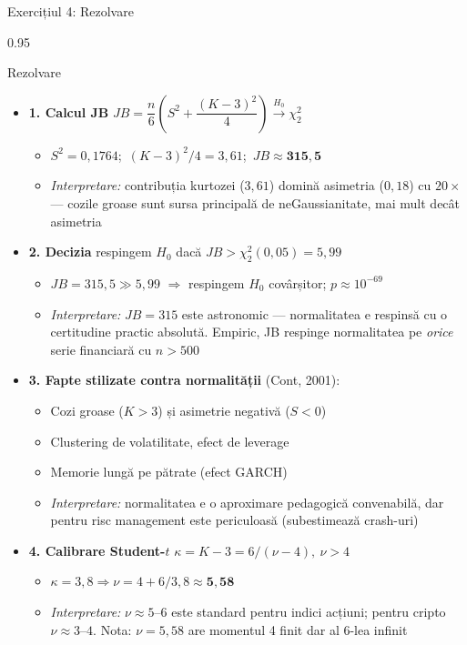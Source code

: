 \documentclass[9pt, aspectratio=169, t]{beamer}
\begin{document}
\begin{frame}[shrink=25]{Exercițiul 4: Rezolvare}
\begin{cminipage}{0.95\textwidth}
\begin{exampleblock}{Rezolvare}
\begin{itemize}\setlength{\itemsep}{0pt}
    \item \textbf{1. Calcul JB} \quad $JB = \dfrac{n}{6}\left(S^2 + \dfrac{(K-3)^2}{4}\right) \xrightarrow{H_0} \chi^2_2$
    \begin{itemize}\setlength{\itemsep}{0pt}
        \item $S^2 = 0{,}1764$;\ $(K-3)^2/4 = 3{,}61$;\ $JB \approx \mathbf{315{,}5}$
        \item \textit{Interpretare:} contribuția kurtozei ($3{,}61$) domină asimetria ($0{,}18$) cu $20\times$ --- cozile groase sunt sursa principală de neGaussianitate, mai mult decât asimetria
    \end{itemize}
    \item \textbf{2. Decizia} \quad respingem $H_0$ dacă $JB > \chi^2_2(0{,}05) = 5{,}99$
    \begin{itemize}\setlength{\itemsep}{0pt}
        \item $JB = 315{,}5 \gg 5{,}99$ $\Rightarrow$ respingem $H_0$ covârșitor; $p \approx 10^{-69}$
        \item \textit{Interpretare:} $JB = 315$ este astronomic --- normalitatea e respinsă cu o certitudine practic absolută. Empiric, JB respinge normalitatea pe \emph{orice} serie financiară cu $n > 500$
    \end{itemize}
    \item \textbf{3. Fapte stilizate contra normalității} (Cont, 2001):
    \begin{itemize}\setlength{\itemsep}{0pt}
        \item Cozi groase ($K > 3$) și asimetrie negativă ($S < 0$)
        \item Clustering de volatilitate, efect de leverage
        \item Memorie lungă pe pătrate (efect GARCH)
        \item \textit{Interpretare:} normalitatea e o aproximare pedagogică convenabilă, dar pentru risc management este periculoasă (subestimează crash-uri)
    \end{itemize}
    \item \textbf{4. Calibrare Student-$t$} \quad $\kappa = K - 3 = 6/(\nu - 4),\ \nu > 4$
    \begin{itemize}\setlength{\itemsep}{0pt}
        \item $\kappa = 3{,}8 \Rightarrow \nu = 4 + 6/3{,}8 \approx \mathbf{5{,}58}$
        \item \textit{Interpretare:} $\nu \approx 5$--$6$ este standard pentru indici acțiuni; pentru cripto $\nu \approx 3$--$4$. Nota: $\nu = 5{,}58$ are momentul 4 finit dar al 6-lea infinit
    \end{itemize}
\end{itemize}
\end{exampleblock}
\end{cminipage}
\end{frame}
\end{document}
